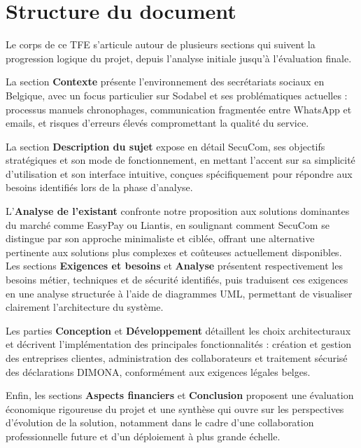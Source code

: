 \section{Structure du document}

Le corps de ce TFE s'articule autour de plusieurs sections qui suivent la progression logique du projet, depuis l'analyse initiale jusqu'à l'évaluation finale.

La section \textbf{Contexte} présente l'environnement des secrétariats sociaux en Belgique, avec un focus particulier sur Sodabel et ses problématiques actuelles : processus manuels chronophages, communication fragmentée entre WhatsApp et emails, et risques d'erreurs élevés compromettant la qualité du service.

La section \textbf{Description du sujet} expose en détail SecuCom, ses objectifs stratégiques et son mode de fonctionnement, en mettant l'accent sur sa simplicité d'utilisation et son interface intuitive, conçues spécifiquement pour répondre aux besoins identifiés lors de la phase d'analyse.

L'\textbf{Analyse de l'existant} confronte notre proposition aux solutions dominantes du marché comme EasyPay ou Liantis, en soulignant comment SecuCom se distingue par son approche minimaliste et ciblée, offrant une alternative pertinente aux solutions plus complexes et coûteuses actuellement disponibles.\\

Les sections \textbf{Exigences et besoins} et \textbf{Analyse} présentent respectivement les besoins métier, techniques et de sécurité identifiés, puis traduisent ces exigences en une analyse structurée à l'aide de diagrammes UML, permettant de visualiser clairement l'architecture du système.

Les parties \textbf{Conception} et \textbf{Développement} détaillent les choix architecturaux et décrivent l'implémentation des principales fonctionnalités : création et gestion des entreprises clientes, administration des collaborateurs et traitement sécurisé des déclarations DIMONA, conformément aux exigences légales belges.

Enfin, les sections \textbf{Aspects financiers} et \textbf{Conclusion} proposent une évaluation économique rigoureuse du projet et une synthèse qui ouvre sur les perspectives d'évolution de la solution, notamment dans le cadre d'une collaboration professionnelle future et d'un déploiement à plus grande échelle.
